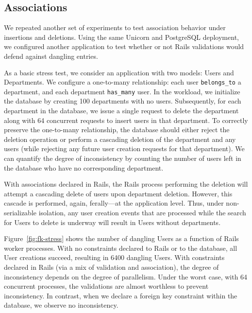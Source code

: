 
\subsection{Associations}

We repeated another set of experiments to test association behavior
under insertions and deletions. Using the same Unicorn and PostgreSQL
deployment, we configured another application to test whether or not
Rails validations would defend against dangling entries.

As a basic stress test, we consider an application with two models:
Users and Departments. We configure a one-to-many relationship: each
user \texttt{belongs\_to} a department, and each department
\texttt{has\_many} user. In the workload, we initialize the database
by creating 100 departments with no users. Subsequently, for each
department in the database, we issue a single request to delete the
department along with 64 concurrent requests to insert users in that
department. To correctly preserve the one-to-many relationship, the
database should either reject the deletion operation or perform a
cascading deletion of the department and any users (while rejecting any
future user creation requests for that department). We can quantify
the degree of inconsistency by counting the number of users left in
the database who have no corresponding department.

With associations declared in Rails, the Rails process performing the
deletion will attempt a cascading delete of users upon department
deletion. However, this cascade is performed, again, ferally---at the
application level. Thus, under non-serializable isolation, any user creation
events that are processed while the search for Users to delete is
underway will result in Users without departments.

Figure~\ref{fig:fk-stress} shows the number of dangling Users as a
function of Rails worker processes. With no constraints declared to
Rails or to the database, all User creations succeed, resulting in
6400 dangling Users. With constraints declared in Rails (via a mix of
validation and association), the degree of inconsistency depends on
the degree of parallelism. Under the worst case, with 64 concurrent
processes, the validations are almost worthless to prevent
inconsistency. In contrast, when we declare a foreign key constraint
within the database, we observe no inconsistency.

